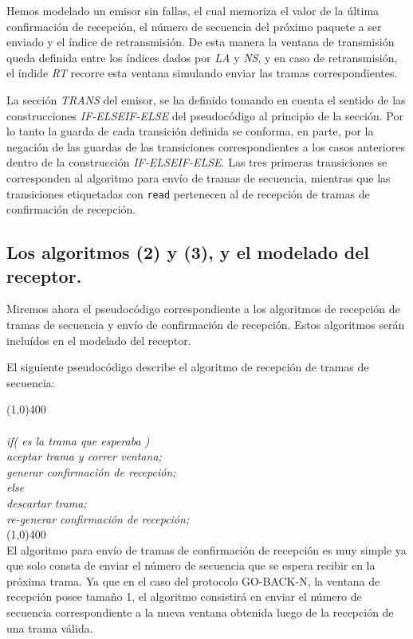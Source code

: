 \documentclass[pdftex,a4paper,12pt]{book}
\begin{document}
Hemos modelado un emisor sin fallas, el cual memoriza el valor de la \'ultima confirmaci\'on de recepci\'on, el n\'umero de secuencia del pr\'oximo paquete a ser enviado y el \'indice de retransmisi\'on. De esta manera la ventana de transmisi\'on queda definida entre los \'indices dados por \textit{LA} y \textit{NS}, y en caso de retransmisi\'on, el \'indide \textit{RT} recorre esta ventana simulando enviar las tramas correspondientes.

La secci\'on \textit{TRANS} del emisor, se ha definido tomando en cuenta el sentido de las construcciones \textit{IF-ELSEIF-ELSE} del pseudoc\'odigo al principio de la secci\'on. Por lo tanto la guarda de cada transici\'on definida se conforma, en parte, por la negaci\'on de las guardas de las transiciones correspondientes a los casos anteriores dentro de la construcci\'on \textit{IF-ELSEIF-ELSE}. Las tres primeras transiciones se corresponden al algoritmo para env\'io de tramas de secuencia, mientras que las transiciones etiquetadas con \texttt{read} pertenecen al de recepci\'on de tramas de confirmaci\'on de recepci\'on.



\subsection*{Los algoritmos (2) y (3), y el modelado del receptor.}


Miremos ahora el pseudoc\'odigo correspondiente a los algoritmos de recepci\'on de tramas de secuencia y env\'io de confirmaci\'on de recepci\'on. Estos algoritmos ser\'an inclu\'idos en el modelado del receptor.

El siguiente pseudoc\'odigo describe el algoritmo de recepci\'on de tramas de secuencia:

\noindent \line(1,0){400}
\textit{\\\\
if( es la trama que esperaba )\\
\indent    aceptar trama y correr ventana;\\
\indent    generar confirmaci\'on de recepci\'on;\\
else\\
\indent    descartar trama;\\
\indent    re-generar confirmaci\'on de recepci\'on;\\
}
\noindent \line(1,0){400}\\

El algoritmo para env\'io de tramas de confirmaci\'on de recepci\'on es muy simple ya que solo consta de enviar el n\'umero de secuencia que se espera recibir en la pr\'oxima trama. Ya que en el caso del protocolo GO-BACK-N, la ventana de recepci\'on posee tama\~no 1, el algoritmo consistir\'a en enviar el n\'umero de secuencia correspondiente a la nueva ventana obtenida luego de la recepci\'on de una trama v\'alida.
\end{document}
